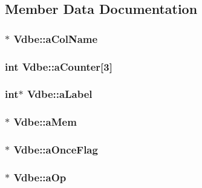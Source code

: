 \subsection{Member Data Documentation}
\hypertarget{struct_vdbe_a900f557143e7d2ab8c560f7ada66d0f7}{
\subsubsection[{a\-Col\-Name}]{$\ast$ Vdbe\-::a\-Col\-Name}}\label{struct_vdbe_a900f557143e7d2ab8c560f7ada66d0f7}
\hypertarget{struct_vdbe_a9838a4909a9a19ead07ca7482a472665}{
\subsubsection[{a\-Counter}]{\setlength{\rightskip}{0pt plus 5cm}int Vdbe\-::a\-Counter\mbox{[}3\mbox{]}}}\label{struct_vdbe_a9838a4909a9a19ead07ca7482a472665}
\hypertarget{struct_vdbe_a8d9c9a70f5a5ffd037cc29cd3d3815b2}{
\subsubsection[{a\-Label}]{\setlength{\rightskip}{0pt plus 5cm}int$\ast$ Vdbe\-::a\-Label}}\label{struct_vdbe_a8d9c9a70f5a5ffd037cc29cd3d3815b2}
\hypertarget{struct_vdbe_ac36776c53b6ec9054a2826ec83f29953}{
\subsubsection[{a\-Mem}]{$\ast$ Vdbe\-::a\-Mem}}\label{struct_vdbe_ac36776c53b6ec9054a2826ec83f29953}
\hypertarget{struct_vdbe_a015887ad1c7c597fb78dc08060cb3dc6}{
\subsubsection[{a\-Once\-Flag}]{$\ast$ Vdbe\-::a\-Once\-Flag}}\label{struct_vdbe_a015887ad1c7c597fb78dc08060cb3dc6}
\hypertarget{struct_vdbe_a1ba82f08947b275dd72a3e3095ad02d5}{
\subsubsection[{a\-Op}]{$\ast$ Vdbe\-::a\-Op}}\label{struct_vdbe_a1ba82f08947b275dd72a3e3095ad02d5}
